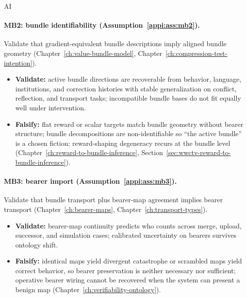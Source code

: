 \begin{authbar}{AI}
\paragraph{MB2: bundle identifiability (Assumption~\ref{appi:ass:mb2}).}
Validate that gradient-equivalent bundle descriptions imply aligned bundle geometry (Chapter~\ref{ch:value-bundle-model}, Chapter~\ref{ch:compression-test-intention}).
\begin{itemize}[nosep]
  \item \textbf{Validate:} active bundle directions are recoverable from behavior, language, institutions, and correction histories with stable generalization on conflict, reflection, and transport tasks; incompatible bundle bases do not fit equally well under intervention.
  \item \textbf{Falsify:} flat reward or scalar targets match bundle geometry without bearer structure; bundle decompositions are non-identifiable so ``the active bundle'' is a chosen fiction; reward-shaping degeneracy recurs at the bundle level (Chapter~\ref{ch:reward-to-bundle-inference}, Section~\ref{sec:wwctv-reward-to-bundle-inference}).
\end{itemize}

\paragraph{MB3: bearer import (Assumption~\ref{appi:ass:mb3}).}
Validate that bundle transport plus bearer-map agreement implies bearer transport (Chapter~\ref{ch:bearer-maps}, Chapter~\ref{ch:transport-types}).
\begin{itemize}[nosep]
  \item \textbf{Validate:} bearer-map continuity predicts who counts across merge, upload, successor, and simulation cases; calibrated uncertainty on bearers survives ontology shift.
  \item \textbf{Falsify:} identical maps yield divergent catastrophe or scrambled maps yield correct behavior, so bearer preservation is neither necessary nor sufficient; operative bearer wiring cannot be recovered when the system can present a benign map (Chapter~\ref{ch:verifiability-ontology}).
\end{itemize}


\end{authbar}
